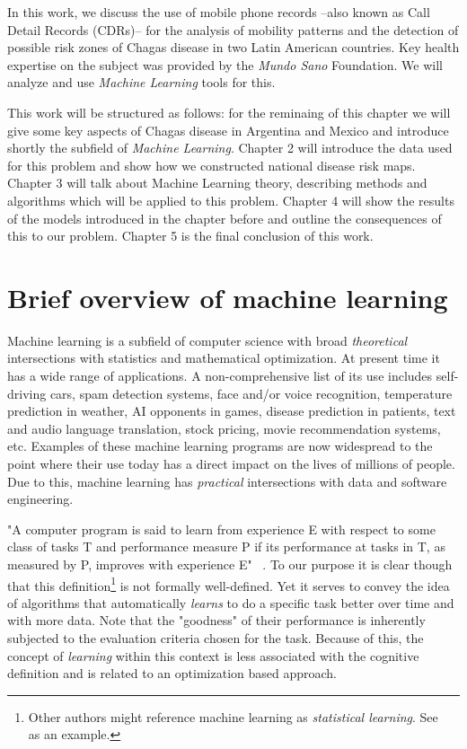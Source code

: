 In this work, we discuss the use of mobile phone records --also known as Call Detail Records (CDRs)-- for the analysis of mobility patterns and the detection of possible risk zones of Chagas disease in two Latin American countries. Key health expertise on the subject was provided by the \textit{Mundo Sano} Foundation. We will analyze and use  \textit{Machine Learning} tools for this.

This work will be structured as follows: for the reminaing of this chapter we will give some key aspects of Chagas disease in Argentina and Mexico and introduce shortly the subfield of \textit{Machine Learning}. Chapter 2 will introduce the data used for this problem and show how we constructed national disease risk maps. Chapter 3 will talk about Machine Learning theory, describing methods and algorithms which will be applied to this problem. Chapter 4 will show the results of the models introduced in the chapter before and outline the consequences of this to our problem. Chapter 5 is the final conclusion of this work.


\section{Brief overview of machine learning}

Machine learning is a subfield of computer science with broad \textit{theoretical} intersections with statistics and mathematical optimization. At present time it has a wide range of applications. A non-comprehensive list of its use includes self-driving cars, spam detection systems, face and/or voice recognition, temperature prediction in weather, AI opponents in games, disease prediction in patients, text and audio language translation, stock pricing, movie recommendation systems, etc. Examples of these machine learning programs are now widespread to the point where their use today has a direct impact on the lives of millions of people. Due to this, machine learning has \textit{practical} intersections with data and software engineering.

"A computer program is said to learn from experience E with respect to some class of tasks T and performance measure P if its performance at tasks in T, as measured by P, improves with experience E" ~\textcite{Mitchell-MLearning}. To our purpose it is clear though that this definition\footnote{Other authors might reference machine learning as \textit{statistical learning}. See ~\textcite{hastie-elemstatslearn} as an example.} is not formally well-defined. Yet it serves to convey the idea of algorithms that automatically \textit{learns} to do a specific task better over time and with more data. Note that the "goodness" of their performance is inherently subjected to the evaluation criteria chosen for the task. Because of this, the concept of \textit{learning} within this context is less associated with the cognitive definition and is related to an optimization based approach.

